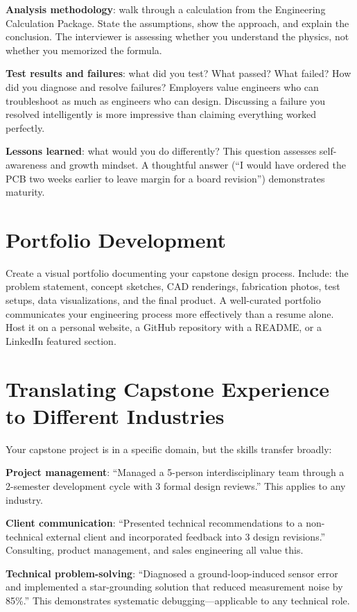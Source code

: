 \textbf{Analysis methodology}: walk through a calculation from the Engineering Calculation Package. State the assumptions, show the approach, and explain the conclusion. The interviewer is assessing whether you understand the physics, not whether you memorized the formula.

\textbf{Test results and failures}: what did you test? What passed? What failed? How did you diagnose and resolve failures? Employers value engineers who can troubleshoot as much as engineers who can design. Discussing a failure you resolved intelligently is more impressive than claiming everything worked perfectly.

\textbf{Lessons learned}: what would you do differently? This question assesses self-awareness and growth mindset. A thoughtful answer (``I would have ordered the PCB two weeks earlier to leave margin for a board revision'') demonstrates maturity.

\section{Portfolio Development}
Create a visual portfolio documenting your capstone design process. Include: the problem statement, concept sketches, CAD renderings, fabrication photos, test setups, data visualizations, and the final product. A well-curated portfolio communicates your engineering process more effectively than a resume alone. Host it on a personal website, a GitHub repository with a README, or a LinkedIn featured section.


\section{Translating Capstone Experience to Different Industries}
Your capstone project is in a specific domain, but the skills transfer broadly:

\textbf{Project management}: ``Managed a 5-person interdisciplinary team through a 2-semester development cycle with 3 formal design reviews.'' This applies to any industry.

\textbf{Client communication}: ``Presented technical recommendations to a non-technical external client and incorporated feedback into 3 design revisions.'' Consulting, product management, and sales engineering all value this.

\textbf{Technical problem-solving}: ``Diagnosed a ground-loop-induced sensor error and implemented a star-grounding solution that reduced measurement noise by 85\%.'' This demonstrates systematic debugging---applicable to any technical role.

